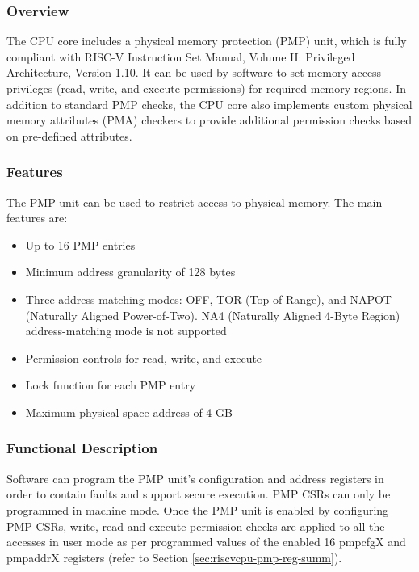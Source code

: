 \documentclass[main\_\_EN.tex]{subfiles}
\begin{document}
\subsubsection{Overview}
\label{sec:riscvcpu-pmp-overview}
The CPU core includes a physical memory protection (PMP) unit, which is fully compliant with RISC-V Instruction Set Manual, Volume II: Privileged Architecture, Version 1.10. It can be used by software to set memory access privileges (read, write, and execute permissions) for required memory regions. In addition to standard PMP checks, the CPU core also implements custom physical memory attributes (PMA) checkers to provide additional permission checks based on pre-defined attributes.

\subsubsection{Features}
\label{sec:riscvcpu-pmp-features}

The PMP unit can be used to restrict access to physical memory. The main features are:

\begin{itemize}
    \item Up to 16 PMP entries
    \item Minimum address granularity of 128 bytes
    \item Three address matching modes: OFF, TOR (Top of Range), and NAPOT (Naturally Aligned Power-of-Two). NA4 (Naturally Aligned 4-Byte Region) address-matching mode is not supported
    \item Permission controls for read, write, and execute
    \item Lock function for each PMP entry
    \item Maximum physical space address of 4 GB
\end{itemize}

\subsubsection{Functional Description}
\label{sec:riscvcpu-pmp-func-descr}
Software can program the PMP unit's configuration and address registers in order to contain faults and support secure execution. PMP CSRs can only be programmed in machine mode. Once the PMP unit is enabled by configuring PMP CSRs, write, read and execute permission checks are applied to all the accesses in user mode as per programmed values of the enabled 16 pmpcfgX and pmpaddrX registers (refer to Section \ref{sec:riscvcpu-pmp-reg-summ}).
\end{document}
